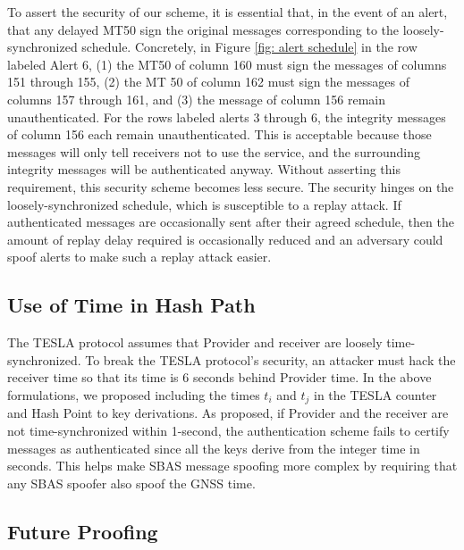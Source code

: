 \documentclass[letterpaper,times]{IONconf/IONconf}
\begin{document}
To assert the security of our scheme, it is essential that, in the event of an alert, that any delayed MT50 sign the original messages corresponding to the loosely-synchronized schedule.
Concretely, in Figure \ref{fig: alert schedule} in the row labeled Alert 6, (1) the MT50 of column 160 must sign the messages of columns 151 through 155, (2) the MT 50 of column 162 must sign the messages of columns 157 through 161, and (3) the message of column 156 remain unauthenticated.
For the rows labeled alerts 3 through 6, the integrity messages of column 156 each remain unauthenticated.
This is acceptable because those messages will only tell receivers not to use the service, and the surrounding integrity messages will be authenticated anyway.
Without asserting this requirement, this security scheme becomes less secure.
The security hinges on the loosely-synchronized schedule, which is susceptible to a replay attack.
If authenticated messages are occasionally sent after their agreed schedule, then the amount of replay delay required is occasionally reduced and an adversary could spoof alerts to make such a replay attack easier.

\subsection{Use of Time in Hash Path} \label{sec: time and keys}

The TESLA protocol assumes that Provider and receiver are loosely time-synchronized.
To break the TESLA protocol's security, an attacker must hack the receiver time so that its time is 6 seconds behind Provider time.
In the above formulations, we proposed including the times $t_i$ and $t_j$ in the TESLA counter and Hash Point to key derivations.
As proposed, if Provider and the receiver are not time-synchronized within 1-second, the authentication scheme fails to certify messages as authenticated since all the keys derive from the integer time in seconds.
This helps make SBAS message spoofing more complex by requiring that any SBAS spoofer also spoof the GNSS time.

\subsection{Future Proofing}
\end{document}
